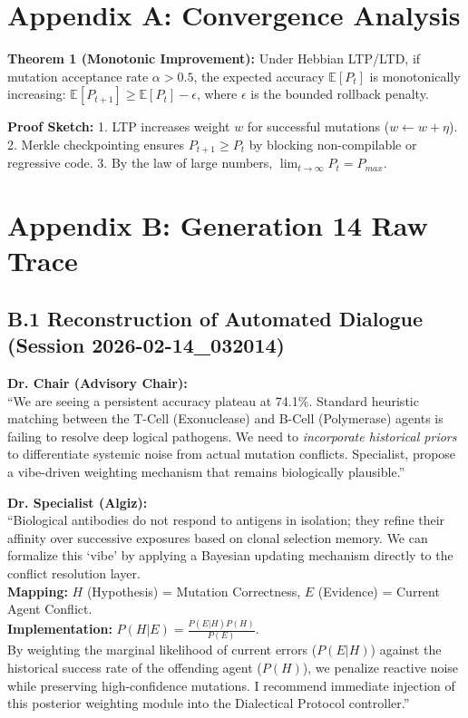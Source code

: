 \section*{Appendix A: Convergence Analysis}
\textbf{Theorem 1 (Monotonic Improvement):} Under Hebbian LTP/LTD, if mutation acceptance rate $\alpha > 0.5$, the expected accuracy $\mathbb{E}[P_t]$ is monotonically increasing: $\mathbb{E}[P_{t+1}] \geq \mathbb{E}[P_t] - \epsilon$, where $\epsilon$ is the bounded rollback penalty.

\textbf{Proof Sketch:} 
1. LTP increases weight $w$ for successful mutations ($w \leftarrow w + \eta$). 
2. Merkle checkpointing ensures $P_{t+1} \geq P_t$ by blocking non-compilable or regressive code. 
3. By the law of large numbers, $\lim_{t \to \infty} P_t = P_{max}$.

\section*{Appendix B: Generation 14 Raw Trace}
\subsection*{B.1 Reconstruction of Automated Dialogue (Session 2026-02-14\_032014)}

\begin{tcolorbox}[colback=gray!5,colframe=blue!40!black]
\small
\textbf{Dr. Chair (Advisory Chair):} \\
``We are seeing a persistent accuracy plateau at 74.1\%. Standard heuristic matching between the T-Cell (Exonuclease) and B-Cell (Polymerase) agents is failing to resolve deep logical pathogens. We need to \textit{incorporate historical priors} to differentiate systemic noise from actual mutation conflicts. Specialist, propose a vibe-driven weighting mechanism that remains biologically plausible.''

\textbf{Dr. Specialist (Algiz):} \\
``Biological antibodies do not respond to antigens in isolation; they refine their affinity over successive exposures based on clonal selection memory. We can formalize this `vibe' by applying a Bayesian updating mechanism directly to the conflict resolution layer. 
\\
\textbf{Mapping:} $H$ (Hypothesis) = Mutation Correctness, $E$ (Evidence) = Current Agent Conflict. \\
\textbf{Implementation:} $P(H|E) = \frac{P(E|H) P(H)}{P(E)}$. 
\\
By weighting the marginal likelihood of current errors ($P(E|H)$) against the historical success rate of the offending agent ($P(H)$), we penalize reactive noise while preserving high-confidence mutations. I recommend immediate injection of this posterior weighting module into the Dialectical Protocol controller.''
\end{tcolorbox}

